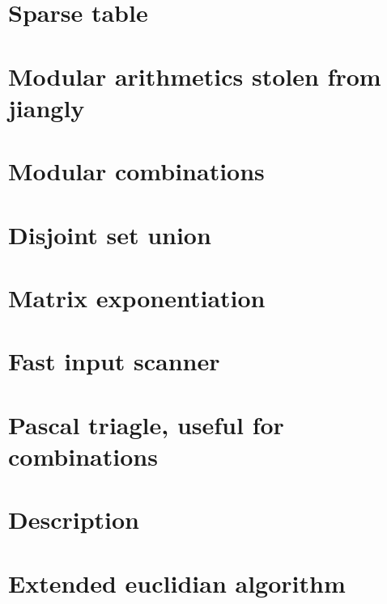 \section{Sparse table}
\raggedbottom

\section{Modular arithmetics stolen from jiangly}
\raggedbottom

\section{Modular combinations}
\raggedbottom

\section{Disjoint set union}
\raggedbottom

\section{Matrix exponentiation}
\raggedbottom

\section{Fast input scanner}
\raggedbottom

\section{Pascal triagle, useful for combinations}
\raggedbottom

\section{Description}
\raggedbottom

\section{Extended euclidian algorithm}
\raggedbottom

